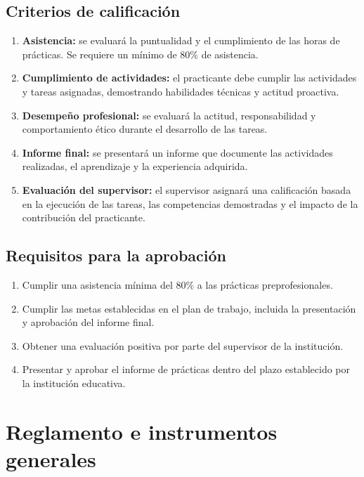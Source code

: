 \documentclass[12pt,a4paper]{article}
\begin{document}
\subsection{Criterios de calificación}
\begin{enumerate}
  \item \textbf{Asistencia:} se evaluará la puntualidad y el cumplimiento de las horas de prácticas. Se requiere un mínimo de 80\% de asistencia.
  \item \textbf{Cumplimiento de actividades:} el practicante debe cumplir las actividades y tareas asignadas, demostrando habilidades técnicas y actitud proactiva.
  \item \textbf{Desempeño profesional:} se evaluará la actitud, responsabilidad y comportamiento ético durante el desarrollo de las tareas.
  \item \textbf{Informe final:} se presentará un informe que documente las actividades realizadas, el aprendizaje y la experiencia adquirida.
  \item \textbf{Evaluación del supervisor:} el supervisor asignará una calificación basada en la ejecución de las tareas, las competencias demostradas y el impacto de la contribución del practicante.
\end{enumerate}

\subsection{Requisitos para la aprobación}
\begin{enumerate}
  \item Cumplir una asistencia mínima del 80\% a las prácticas preprofesionales.
  \item Cumplir las metas establecidas en el plan de trabajo, incluida la presentación y aprobación del informe final.
  \item Obtener una evaluación positiva por parte del supervisor de la institución.
  \item Presentar y aprobar el informe de prácticas dentro del plazo establecido por la institución educativa.
\end{enumerate}

\section{Reglamento e instrumentos generales}
\end{document}
